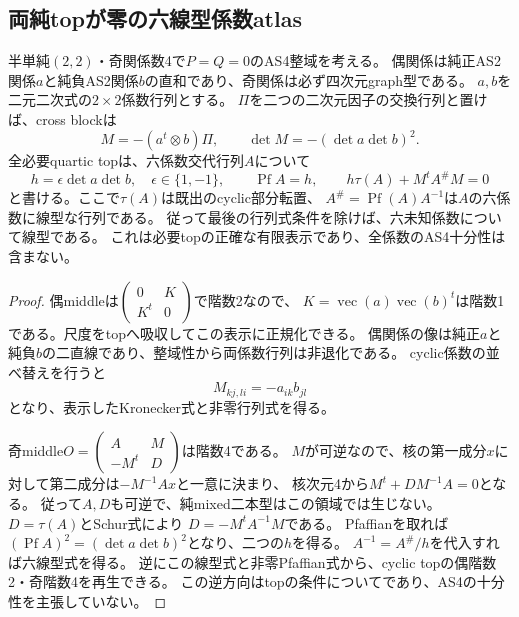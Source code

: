 \subsection{両純topが零の六線型係数atlas}
\label{subsec:h3-order2-22-rank4-zero-top-atlas}
\begin{proposition}\label{prop:h3-order2-22-rank4-zero-top-atlas}
半単純$(2,2)$・奇関係数4で$P=Q=0$のAS4整域を考える。
偶関係は純正AS2関係$a$と純負AS2関係$b$の直和であり、奇関係は必ず四次元graph型である。
$a,b$を二元二次式の$2\times2$係数行列とする。
$\Pi$を二つの二次元因子の交換行列と置けば、cross blockは
\[
 M=-(a^t\otimes b)\Pi,\qquad\det M=-(\det a\det b)^2.
\]
全必要quartic topは、六係数交代行列$A$について
\[
 h=\epsilon\det a\det b,\quad\epsilon\in\{1,-1\},\qquad
 \operatorname{Pf}A=h,\qquad h\tau(A)+M^tA^\#M=0
\]
と書ける。ここで$\tau(A)$は既出のcyclic部分転置、
$A^\#=\operatorname{Pf}(A)A^{-1}$は$A$の六係数に線型な行列である。
従って最後の行列式条件を除けば、六未知係数について線型である。
これは必要topの正確な有限表示であり、全係数のAS4十分性は含まない。
\end{proposition}
\begin{proof}
偶middleは$\left(\begin{smallmatrix}0&K\\K^t&0\end{smallmatrix}\right)$で階数2なので、
$K=\operatorname{vec}(a)\operatorname{vec}(b)^t$は階数1である。尺度をtopへ吸収してこの表示に正規化できる。
偶関係の像は純正$a$と純負$b$の二直線であり、整域性から両係数行列は非退化である。
cyclic係数の並べ替えを行うと
\[
 M_{kj,li}=-a_{ik}b_{jl}
\]
となり、表示したKronecker式と非零行列式を得る。

奇middle$O=\left(\begin{smallmatrix}A&M\\-M^t&D\end{smallmatrix}\right)$は階数4である。
$M$が可逆なので、核の第一成分$x$に対して第二成分は$-M^{-1}Ax$と一意に決まり、
核次元4から$M^t+DM^{-1}A=0$となる。
従って$A,D$も可逆で、純mixed二本型はこの領域では生じない。
$D=\tau(A)$とSchur式により
$D=-M^tA^{-1}M$である。
Pfaffianを取れば$(\operatorname{Pf}A)^2=(\det a\det b)^2$となり、二つの$h$を得る。
$A^{-1}=A^\#/h$を代入すれば六線型式を得る。
逆にこの線型式と非零Pfaffian式から、cyclic topの偶階数2・奇階数4を再生できる。
この逆方向はtopの条件についてであり、AS4の十分性を主張していない。
\end{proof}

